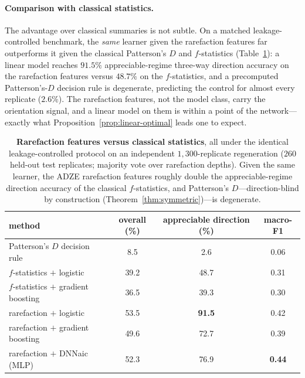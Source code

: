 \documentclass[11pt]{article}
\theoremstyle{plain}
\theoremstyle{definition}
\theoremstyle{remark}
\begin{document}
\paragraph{Comparison with classical statistics.} The advantage over classical summaries is not
subtle. On a matched leakage-controlled benchmark, the \emph{same} learner given the rarefaction
features far outperforms it given the classical Patterson's $D$ and $f$-statistics
(Table~\ref{tab:sota}): a linear model reaches $91.5\%$ appreciable-regime three-way direction
accuracy on the rarefaction features versus $48.7\%$ on the $f$-statistics, and a precomputed
Patterson's-$D$ decision rule is degenerate, predicting the control for almost every replicate
($2.6\%$). The rarefaction features, not the model class, carry the orientation signal, and a linear
model on them is within a point of the network---exactly what Proposition~\ref{prop:linear-optimal}
leads one to expect.

\begin{table}[H]
\centering
\scriptsize
\begin{tabular}{lccc}
\toprule
method & overall (\%) & appreciable direction (\%) & macro-F1 \\
\midrule
Patterson's $D$ decision rule & 8.5 & 2.6 & 0.06 \\
$f$-statistics $+$ logistic & 39.2 & 48.7 & 0.31 \\
$f$-statistics $+$ gradient boosting & 36.5 & 39.3 & 0.30 \\
rarefaction $+$ logistic & 53.5 & \textbf{91.5} & 0.42 \\
rarefaction $+$ gradient boosting & 49.6 & 72.7 & 0.39 \\
rarefaction $+$ DNNaic (MLP) & 52.3 & 76.9 & \textbf{0.44} \\
\bottomrule
\end{tabular}
\caption{\textbf{Rarefaction features versus classical statistics}, all under the identical
leakage-controlled protocol on an independent $1{,}300$-replicate regeneration ($260$ held-out test
replicates; majority vote over rarefaction depths). Given the same learner, the ADZE rarefaction
features roughly double the appreciable-regime direction accuracy of the classical $f$-statistics,
and Patterson's $D$---direction-blind by construction (Theorem~\ref{thm:symmetric})---is degenerate.}
\label{tab:sota}
\end{table}
\end{document}
